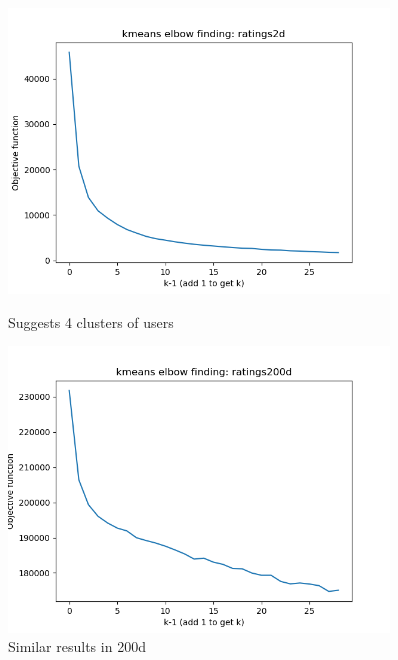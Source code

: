 \documentclass[11pt]{article}
\begin{document}
\begin{figure}[h!]
    \centering
    \begin{minipage}{0.45\textwidth}
        \centering
        \includegraphics[width=0.9\textwidth]{kmeans_elbow_2d} %
        \caption{Suggests 4 clusters of users}
    \end{minipage}\hfill
    \begin{minipage}{0.45\textwidth}
        \centering
        \includegraphics[width=0.9\textwidth]{kmeans_elbow_200d} %
        \caption{Similar results in 200d}
    \end{minipage}
\end{figure}\newline


% 

\end{document}
